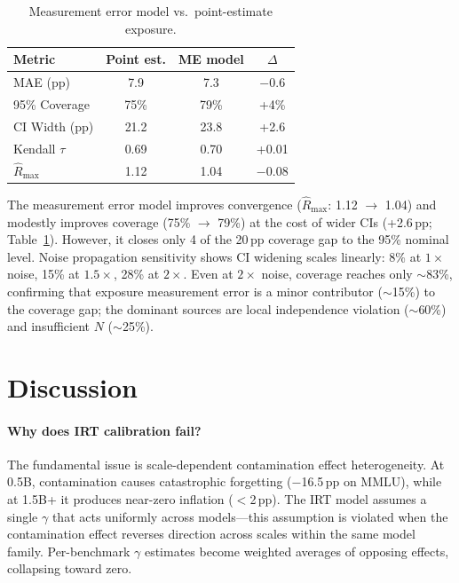 \documentclass[11pt,a4paper]{article}
\begin{document}
\begin{table}[h]
\centering
\caption{Measurement error model vs.\ point-estimate exposure.}
\label{tab:me}
\begin{tabular}{lccc}
\toprule
Metric & Point est. & ME model & $\Delta$ \\
\midrule
MAE (pp) & 7.9 & 7.3 & $-$0.6 \\
95\% Coverage & 75\% & 79\% & +4\% \\
CI Width (pp) & 21.2 & 23.8 & +2.6 \\
Kendall $\tau$ & 0.69 & 0.70 & +0.01 \\
$\hat{R}_{\max}$ & 1.12 & 1.04 & $-$0.08 \\
\bottomrule
\end{tabular}
\end{table}

The measurement error model improves convergence ($\hat{R}_{\max}$: 1.12 $\to$ 1.04) and modestly improves coverage (75\% $\to$ 79\%) at the cost of wider CIs (+2.6\,pp; Table~\ref{tab:me}).
However, it closes only 4 of the 20\,pp coverage gap to the 95\% nominal level.
Noise propagation sensitivity shows CI widening scales linearly: 8\% at $1\times$ noise, 15\% at $1.5\times$, 28\% at $2\times$.
Even at $2\times$ noise, coverage reaches only $\sim$83\%, confirming that exposure measurement error is a minor contributor ($\sim$15\%) to the coverage gap; the dominant sources are local independence violation ($\sim$60\%) and insufficient $N$ ($\sim$25\%).

\section{Discussion}

\paragraph{Why does IRT calibration fail?}
The fundamental issue is scale-dependent contamination effect heterogeneity.
At 0.5B, contamination causes catastrophic forgetting ($-$16.5\,pp on MMLU), while at 1.5B+ it produces near-zero inflation ($<$2\,pp).
The IRT model assumes a single $\gamma$ that acts uniformly across models---this assumption is violated when the contamination effect reverses direction across scales within the same model family.
Per-benchmark $\gamma$ estimates become weighted averages of opposing effects, collapsing toward zero.
\end{document}
